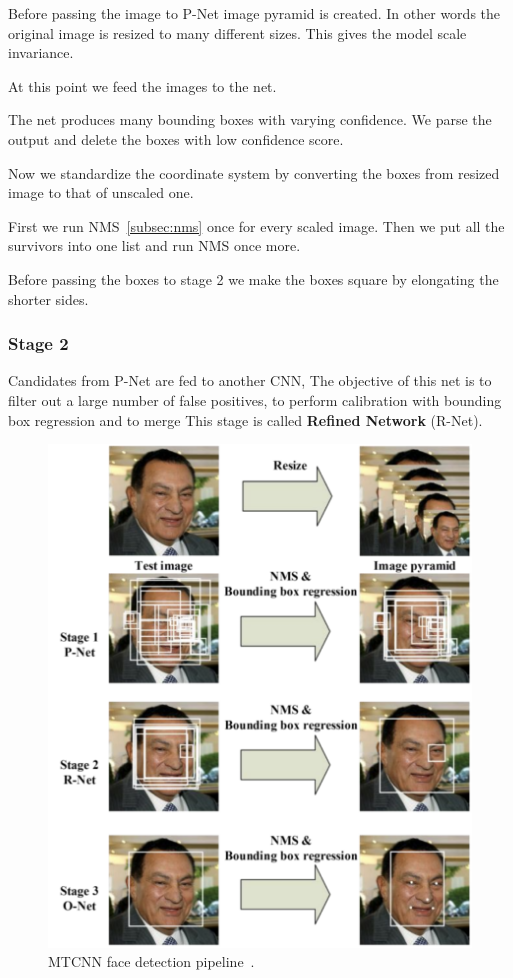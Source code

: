 Before passing the image to P-Net image pyramid is created.
In other words the original image is resized to many different sizes.
This gives the model scale invariance.

At this point we feed the images to the net.

The net produces many bounding boxes with varying confidence.
We parse the output and delete the boxes with low confidence score.

Now we standardize the coordinate system by converting the boxes from resized image to that of unscaled one.

First we run NMS~\ref{subsec:nms} once for every scaled image.
Then we put all the survivors into one list and run NMS once more.

Before passing the boxes to stage 2 we make the boxes square by elongating the shorter sides.

\subsubsection{Stage 2}
Candidates from P-Net are fed to another CNN,
The objective of this net is to filter out a large number of false positives, to perform calibration with bounding
box regression and to merge
This stage is called \textbf{Refined Network} (R-Net).

\begin{figure}[H]
    \centering
    \includegraphics[width=0.8\columnwidth]{images/face-recognition/mtcnn.png}
    \caption{MTCNN face detection pipeline~\cite{MTCNN}.}
    \label{fig:mtcnn}
\end{figure}